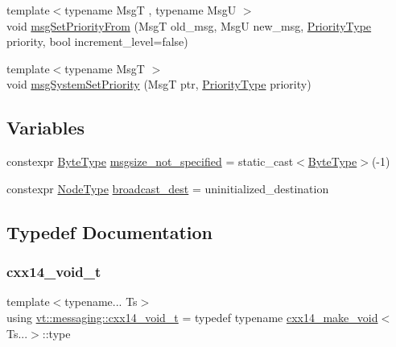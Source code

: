 \begin{DoxyCompactItemize}
\item 
{\footnotesize template$<$typename MsgT , typename MsgU $>$ }\\void \hyperlink{namespacevt_1_1messaging_a9cbb4989b799eaba6ab9b8dde9e3cf14}{msg\+Set\+Priority\+From} (MsgT old\+\_\+msg, MsgU new\+\_\+msg, \hyperlink{namespacevt_a86bff9f556eb761b27fc8600d006ac04}{Priority\+Type} priority, bool increment\+\_\+level=false)
\item 
{\footnotesize template$<$typename MsgT $>$ }\\void \hyperlink{namespacevt_1_1messaging_ab609ea1ed68952c30bc8f9bba8d796b2}{msg\+System\+Set\+Priority} (MsgT ptr, \hyperlink{namespacevt_a86bff9f556eb761b27fc8600d006ac04}{Priority\+Type} priority)
\end{DoxyCompactItemize}
\subsection*{Variables}
\begin{DoxyCompactItemize}
\item 
constexpr \hyperlink{namespacevt_aab8d55968084610ce3b17057981e9300}{Byte\+Type} \hyperlink{namespacevt_1_1messaging_adefd943a6421b1b7120526f969bee20f}{msgsize\+\_\+not\+\_\+specified} = static\+\_\+cast$<$\hyperlink{namespacevt_aab8d55968084610ce3b17057981e9300}{Byte\+Type}$>$(-\/1)
\item 
constexpr \hyperlink{namespacevt_a866da9d0efc19c0a1ce79e9e492f47e2}{Node\+Type} \hyperlink{namespacevt_1_1messaging_a11d2b356f56486f2e60f0255cb6b05ff}{broadcast\+\_\+dest} = uninitialized\+\_\+destination
\end{DoxyCompactItemize}


\subsection{Typedef Documentation}
\mbox{\label{namespacevt_1_1messaging_a9724e719b301289eb8b3afbf9c44cf46}} 
\subsubsection{\texorpdfstring{cxx14\+\_\+void\+\_\+t}{cxx14\_void\_t}}
{\footnotesize\ttfamily template$<$typename... Ts$>$ \\
using \hyperlink{namespacevt_1_1messaging_a9724e719b301289eb8b3afbf9c44cf46}{vt\+::messaging\+::cxx14\+\_\+void\+\_\+t} = typedef typename \hyperlink{structvt_1_1messaging_1_1cxx14__make__void}{cxx14\+\_\+make\+\_\+void}$<$Ts...$>$\+::type}


